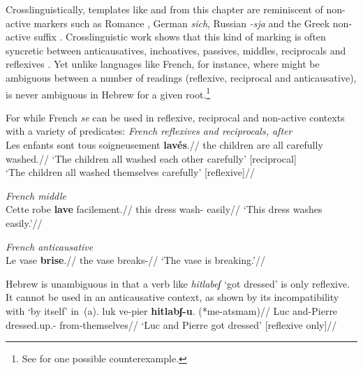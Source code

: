 Crosslinguistically, templates like {\tnif} and {\thit} from this chapter are reminiscent of non-active markers such as Romance , German \emph{sich}, Russian \emph{-sja} and the Greek non-active suffix . Crosslinguistic work shows that this kind of marking is often syncretic between anticausatives, inchoatives, passives, middles, reciprocals and reflexives \citep{geniusiene87,klaiman91,alexiadoudoron12}. Yet unlike languages like French, for instance, where  might be ambiguous between a number of readings (reflexive, reciprocal and anticausative), {\thit} is never ambiguous in Hebrew for a given root.\footnote{See \cite{kastner17gjgl} for one possible counterexample.}

For while French \emph{se} can be used in reflexive, reciprocal and non-active contexts with a variety of predicates:
\pex
	\textit{French reflexives and reciprocals, after} \citet[839]{labelle08}\\
	\begingl
	\gla Les enfants  sont tous soigneusement \textbf{lav\'es}.//
	\glb the children  are all carefully washed.//
	\glft `The children all washed each other carefully' \hfill [reciprocal]\\
	`The children all washed themselves carefully' \hfill [reflexive]//
	\endgl

	\a \textit{French middle} \citep[835]{labelle08}\\
	\begingl
	\gla Cette robe  \textbf{lave} facilement.//
	\glb this dress  wash- easily//
	\glft `This dress washes easily.'//
	\endgl
	
	\a \textit{French anticausative} \citep[835]{labelle08}\\
	\begingl
	\gla Le vase  \textbf{brise}.//
	\glb the vase  breaks-//
	\glft `The vase is breaking.'//
	\endgl
\xe

Hebrew {\thit} is unambiguous in that a verb like \emph{hitlabeʃ} `got dressed' is only reflexive. It cannot be used in an anticausative context, as shown by its incompatibility with `by itself' in~(\nextx a).
\ex
	\begingl
	\gla luk ve-pier \textbf{hitlabʃ-u}. (*me-a{ts}mam)//
	\glb Luc and-Pierre dressed.up.- \phantom{(*}from-themselves//
	\glft `Luc and Pierre got dressed' \hfill [reflexive only]//
	\endgl
\xe

